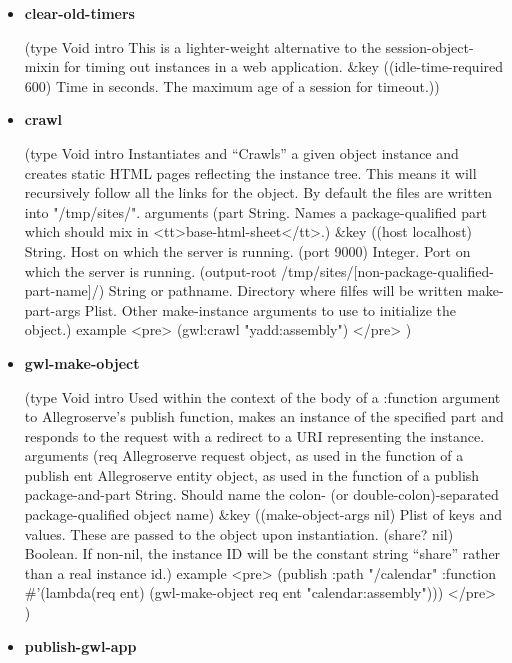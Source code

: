 \documentclass [11pt]{book}
\begin{document}
\begin{itemize}
\item {}
\label{prim:clear-old-timers}
\textbf{clear-old-timers}

(type Void intro
  This is a lighter-weight alternative to the session-object-mixin for timing out instances
in a web application.
 \&key
 ((idle-time-required 600)
  Time in seconds. The maximum age of a session for timeout.))



\item {}
\label{prim:crawl}
\textbf{crawl}

(type Void intro
  Instantiates and ``Crawls'' a given object instance and creates static HTML pages reflecting
the instance tree. This means it will recursively follow all the links for the object. By default
the files are written into "/tmp/sites/".
 arguments
 (part
  String. Names a package-qualified part which should mix in <tt>base-html-sheet</tt>.)
 \&key
 ((host localhost) String. Host on which the server is running.
  (port 9000) Integer. Port on which the server is running.
  (output-root /tmp/sites/[non-package-qualified-part-name]/)
  String or pathname. Directory where filfes will be written
  make-part-args
  Plist. Other make-instance arguments to use to initialize the object.)
 example 
<pre>
    (gwl:crawl "yadd:assembly")
</pre>
)



\item {}
\label{prim:gwl-make-object}
\textbf{gwl-make-object}

(type Void intro
  Used within the context of the body of a :function argument to Allegroserve's
publish function, makes an instance of the specified part and responds to the request
with a redirect to a URI representing the instance.
 arguments
 (req Allegroserve request object, as used in the function of a publish
  ent Allegroserve entity object, as used in the function of a publish
  package-and-part
  String. Should name the colon- (or double-colon)-separated
package-qualified object name)
 \&key
 ((make-object-args nil)
  Plist of keys and values. These are passed to the object upon instantiation.
  (share? nil)
  Boolean. If non-nil, the instance ID will be the constant string ``share'' rather than a real instance id.)
 example <pre> 
  (publish :path "/calendar"
           :function \#'(lambda(req ent) (gwl-make-object req ent "calendar:assembly")))
</pre>
)



\item {}
\label{prim:publish-gwl-app}
\textbf{publish-gwl-app}


\end{itemize}
\end{document}
